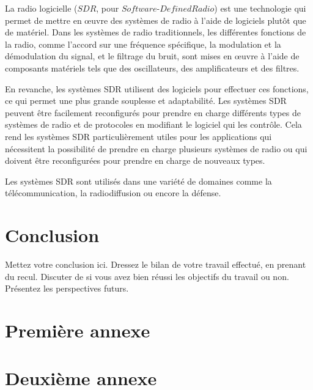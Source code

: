 \documentclass[12pt,a4paper,oneside, titlepage]{report}
\begin{document}
La radio logicielle ($SDR$, pour $Software$-$Defined Radio$) est une technologie qui permet de mettre en œuvre des systèmes de radio à l'aide de logiciels plutôt que de matériel. Dans les systèmes de radio traditionnels, les différentes fonctions de la radio, comme l'accord sur une fréquence spécifique, la modulation et la démodulation du signal, et le filtrage du bruit, sont mises en œuvre à l'aide de composants matériels tels que des oscillateurs, des amplificateurs et des filtres.

En revanche, les systèmes SDR utilisent des logiciels pour effectuer ces fonctions, ce qui permet une plus grande souplesse et adaptabilité. Les systèmes SDR peuvent être facilement reconfigurés pour prendre en charge différents types de systèmes de radio et de protocoles en modifiant le logiciel qui les contrôle. Cela rend les systèmes SDR particulièrement utiles pour les applications qui nécessitent la possibilité de prendre en charge plusieurs systèmes de radio ou qui doivent être reconfigurées pour prendre en charge de nouveaux types.

Les systèmes SDR sont utilisés dans une variété de domaines comme  la télécommunication, la radiodiffusion ou encore la défense.


\chapter*{Conclusion}
\renewcommand{\leftmark}{CONCLUSION}

Mettez votre conclusion ici.  Dressez le bilan de votre travail effectué, en prenant du recul. Discuter de si vous avez bien réussi les objectifs du travail ou non. Présentez les perspectives futurs.






\newpage
\appendix
{}

\chapter{Premi\`ere annexe}
\renewcommand{\leftmark}{ANNEXE \thechapter.~~Premi\`ere annexe}
\label{annexe1}

\chapter{Deuxi\`eme annexe}
\renewcommand{\leftmark}{ANNEXE \thechapter.~~Deuxi\`eme annexe}
\label{annexe2}

\end{document}
